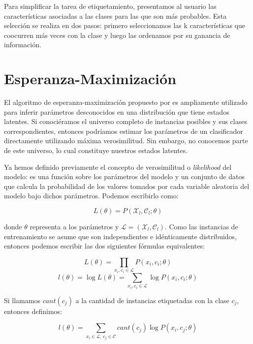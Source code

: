 Para simplificar la tarea de etiquetamiento, presentamos al usuario las características asociadas a las clases para las que son más probables. Esta selección se realiza en dos pasos: primero seleccionamos las k características que coocurren más veces con la clase y luego las ordenamos por su ganancia de información.

\section{Esperanza-Maximización}
El algoritmo de esperanza-maximización propuesto por \citet{Dempster-maximumlikelihood} es ampliamente utilizado para inferir parámetros desconocidos en una distribución que tiene estados latentes. Si conociéramos el universo completo de instancias posibles y sus clases correspondientes, entonces podríamos estimar los parámetros de un clasificador directamente utilizando máxima verosimilitud. Sin embargo, no conocemos parte de este universo, lo cual constituye nuestros estados latentes.

Ya hemos definido previamente el concepto de verosimilitud o \textit{likelihood} del modelo: es una función sobre los parámetros del modelo y un conjunto de datos que calcula la probabilidad de los valores tomados por cada variable aleatoria del modelo bajo dichos parámetros. Podemos escribirlo como:

\begin{equation}
L(\theta) = P(\mathcal{X}_l, \mathcal{C}_l; \theta)
\end{equation}

donde $\theta$ representa a los parámetros y $\mathcal{L} = (\mathcal{X}_l, \mathcal{C}_l)$. Como las instancias de entrenamiento se asume que son independientes e idénticamente distribuidos, entonces podemos escribir las dos siguientes fórmulas equivalentes:

\begin{equation}
L(\theta) = \prod_{x_i, c_i \in \mathcal{L}} P(x_i, c_i; \theta)
\end{equation}
\begin{equation}
l(\theta) = \log L(\theta) = \sum_{x_i, c_i \in \mathcal{L}} \log P(x_i, c_i; \theta)
\end{equation}

Si llamamos $cant(c_j)$ a la cantidad de instancias etiquetadas con la clase $c_j$, entonces definimos:

\begin{equation}
l(\theta) = \sum_{x_i \in \mathcal{L}, \, c_j \in \mathcal{C}} cant(c_j) \log P(x_i, c_j; \theta)
\end{equation}

